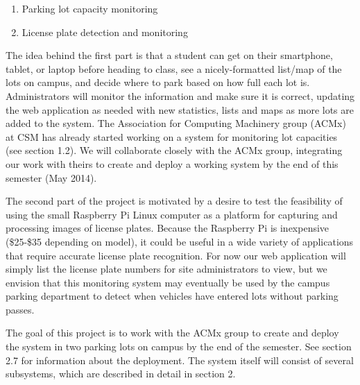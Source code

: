 \documentclass[11pt, oneside, fullpage, doublespace]{article}
\begin{document}
\begin{enumerate}
\item Parking lot capacity monitoring
\item License plate detection and monitoring
\end{enumerate}

The idea behind the first part is that a student can get on their smartphone, tablet, or laptop before heading to class, see a nicely-formatted list/map of the lots on campus, and decide where to park based on how full each lot is. Administrators will monitor the information and make sure it is correct, updating the web application as needed with new statistics, lists and maps as more lots are added to the system. The Association for Computing Machinery group (ACMx) at CSM has already started working on a system for monitoring lot capacities (see section 1.2). We will collaborate closely with the ACMx group, integrating our work with theirs to create and deploy a working system by the end of this semester (May 2014).

The second part of the project is motivated by a desire to test the feasibility of using the small Raspberry Pi Linux computer as a platform for capturing and processing images of license plates. Because the Raspberry Pi is inexpensive (\$25-\$35 depending on model), it could be useful in a wide variety of applications that require accurate license plate recognition. For now our web application will simply list the license plate numbers for site administrators to view, but we envision that this monitoring system may eventually be used by the campus parking department to detect when vehicles have entered lots without parking passes.

The goal of this project is to work with the ACMx group to create and deploy the system in two parking lots on campus by the end of the semester. See section 2.7 for information about the deployment. The system itself will consist of several subsystems, which are described in detail in section 2.
\end{document}
